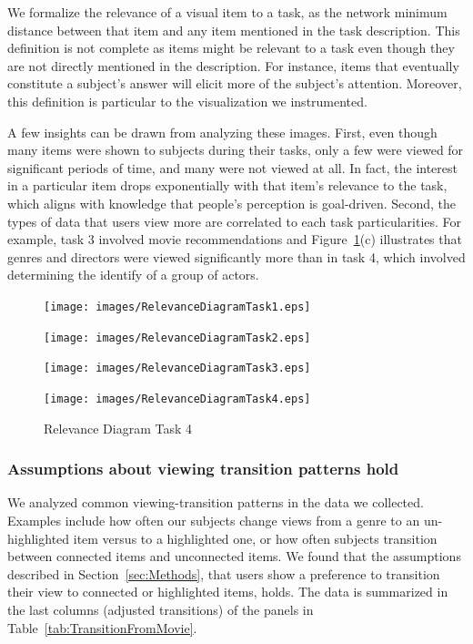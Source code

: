 We formalize the relevance of a visual item to a task, as the network minimum distance between that item and any item mentioned in the task description.  This definition is not complete as items might be relevant to a task even though they are not directly mentioned in the description.  For instance, items that eventually constitute a subject's answer will elicit more of the subject's attention. Moreover, this definition is particular to the visualization we instrumented.

A few insights can be drawn from analyzing these images. First, even though many items were shown to subjects during their tasks, only a few were viewed for significant periods of time, and many were not viewed at all. In fact, the interest in a particular item drops exponentially with that item's relevance to the task, which aligns with knowledge that people's perception is goal-driven.  Second, the types of data that users view more are correlated to each task particularities. For example, task 3 involved movie recommendations and Figure~\ref{fig:RelevanceDiagram}(c) illustrates that genres and directors were viewed significantly more than in task 4, which involved determining the identify of a group of actors. 



\begin{figure}[!htb]
  \centering
  \texttt{[image: images/RelevanceDiagramTask1.eps]}
	\caption*{Relevance Diagram Task 1}
	\texttt{[image: images/RelevanceDiagramTask2.eps]}
	\caption*{Relevance Diagram Task 2}
	\texttt{[image: images/RelevanceDiagramTask3.eps]}
	\caption*{Relevance Diagram Task 3}
	\texttt{[image: images/RelevanceDiagramTask4.eps]}
	\caption*{Relevance Diagram Task 4}
	\label{fig:RelevanceDiagram}
\end{figure}





\subsubsection{Assumptions about viewing transition patterns hold}
We analyzed common viewing-transition patterns in the data we collected. Examples include how often our subjects change views from a genre to an un-highlighted item versus to a highlighted one, or how often subjects transition between connected items and unconnected items. We found that the assumptions described in Section~\ref{sec:Methods}, that users show a preference to transition their view to connected or highlighted items, holds. The data is summarized in the last columns  (adjusted transitions) of the panels in Table~\ref{tab:TransitionFromMovie}.

